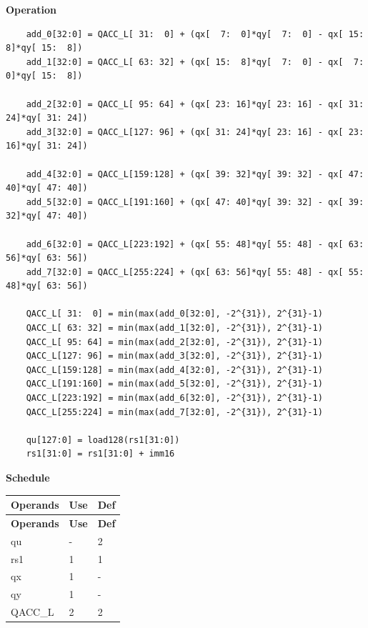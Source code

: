 \textbf{Operation}\\
\begin{lstlisting}
    add_0[32:0] = QACC_L[ 31:  0] + (qx[  7:  0]*qy[  7:  0] - qx[ 15:  8]*qy[ 15:  8])
    add_1[32:0] = QACC_L[ 63: 32] + (qx[ 15:  8]*qy[  7:  0] - qx[  7:  0]*qy[ 15:  8])

    add_2[32:0] = QACC_L[ 95: 64] + (qx[ 23: 16]*qy[ 23: 16] - qx[ 31: 24]*qy[ 31: 24])
    add_3[32:0] = QACC_L[127: 96] + (qx[ 31: 24]*qy[ 23: 16] - qx[ 23: 16]*qy[ 31: 24])

    add_4[32:0] = QACC_L[159:128] + (qx[ 39: 32]*qy[ 39: 32] - qx[ 47: 40]*qy[ 47: 40])
    add_5[32:0] = QACC_L[191:160] + (qx[ 47: 40]*qy[ 39: 32] - qx[ 39: 32]*qy[ 47: 40])

    add_6[32:0] = QACC_L[223:192] + (qx[ 55: 48]*qy[ 55: 48] - qx[ 63: 56]*qy[ 63: 56])
    add_7[32:0] = QACC_L[255:224] + (qx[ 63: 56]*qy[ 55: 48] - qx[ 55: 48]*qy[ 63: 56])

    QACC_L[ 31:  0] = min(max(add_0[32:0], -2^{31}), 2^{31}-1)
    QACC_L[ 63: 32] = min(max(add_1[32:0], -2^{31}), 2^{31}-1)
    QACC_L[ 95: 64] = min(max(add_2[32:0], -2^{31}), 2^{31}-1)
    QACC_L[127: 96] = min(max(add_3[32:0], -2^{31}), 2^{31}-1)
    QACC_L[159:128] = min(max(add_4[32:0], -2^{31}), 2^{31}-1)
    QACC_L[191:160] = min(max(add_5[32:0], -2^{31}), 2^{31}-1)
    QACC_L[223:192] = min(max(add_6[32:0], -2^{31}), 2^{31}-1)
    QACC_L[255:224] = min(max(add_7[32:0], -2^{31}), 2^{31}-1)

    qu[127:0] = load128(rs1[31:0])
    rs1[31:0] = rs1[31:0] + imm16
\end{lstlisting}

\textbf{Schedule}\\
\begin{longtable}[c]{|l|l|l|}
    \hline
    \rowcolor{lightgray}
    \textbf{Operands} & \textbf{Use} & \textbf{Def} \\\hline
    \endfirsthead
    \hline
    \rowcolor{lightgray}
     \textbf{Operands} & \textbf{Use} & \textbf{Def} \\\hline
    \endhead
    \hline
    \endfoot

    qu & - & 2 \\\hline
    rs1 & 1 & 1 \\\hline
     qx & 1 & - \\\hline
     qy & 1 & - \\\hline
     QACC\_L & 2 & 2

\end{longtable}

